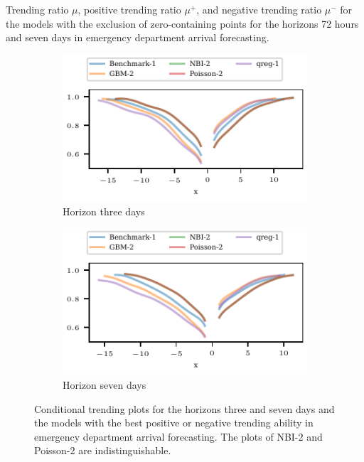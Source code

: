 \documentclass[pdflatex]{sn-jnl}
\theoremstyle{plain}%
\theoremstyle{definition}
\newcommand{\acc}{\mu}
\newcommand{\accp}{\acc^+}
\newcommand{\accm}{\acc^-}
\begin{document}
\begin{table}
    \centering
    \tiny
    
    \caption[Trending ratios for the emergency department arrival forecasts.]{Trending ratio $\acc$, positive trending ratio $\accp$, and negative trending ratio $\accm$ for the models with the exclusion of zero-containing points for the horizons 72 hours and seven days in emergency department arrival forecasting.}
    \label{tab:app-eda-trending-ratios}
\end{table}

\begin{figure}
    \centering
    \begin{subfigure}[t]{0.48\textwidth}
    \includegraphics{plots/ed_arrival/50_Cond_Prob_lag_3}
    \caption{Horizon three days}
    \end{subfigure}\hfill
    \begin{subfigure}[t]{0.48\textwidth}
    \includegraphics{plots/ed_arrival/50_Cond_Prob_lag_7}
    \caption{Horizon seven days}
    \end{subfigure}
    \caption[Conditional trending plots for the horizons three and seven days and the models with the best positive or negative trending ability in emergency department arrival forecasting.]{Conditional trending plots for the horizons three and seven days and the models with the best positive or negative trending ability in emergency department arrival forecasting. The plots of NBI-2 and Poisson-2 are indistinguishable.}
    \label{fig:app-eda-cond-prob}
\end{figure}
\end{document}

